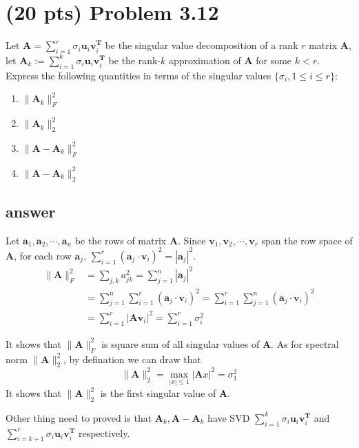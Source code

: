 \documentclass[12pt]{article}
\begin{document}
\section{(20 pts) Problem 3.12}
Let $\mathbf{A}=\sum_{i=1}^{r}{\sigma_i\mathbf{u}_i\mathbf{v}_i^\mathbf{T}}$ be the singular value decomposition of a rank $r$ matrix $\mathbf{A}$, let $\mathbf{A}_k:=\sum_{i=1}^k{\sigma_i\mathbf{u}_i\mathbf{v}_i^\mathbf{T}}$ be the rank-$k$ approximation of $\mathbf{A}$ for some $k<r$. Express the following quantities in terms of the singular values $\{\sigma_i,1\le i\le r\}$:
  \begin{enumerate}
      \item $\|\mathbf{A}_k \|_F^2$
      \item $\|\mathbf{A}_k \|_2^2$
      \item $\|\mathbf{A}-\mathbf{A}_k \|_F^2$
      \item $\|\mathbf{A}-\mathbf{A}_k \|_2^2$
  \end{enumerate}

\subsection*{answer}

Let $\mathbf a_1, \mathbf a_2, \cdots, \mathbf a_n$ be the rows of matrix $\mathbf A$. Since $\mathbf v_1, \mathbf v_2, \cdots, \mathbf v_r$ span the row space of $\mathbf A$, for each row $\mathbf a_j$, $\sum\limits_{i=1}^{r}(\mathbf a_j \cdot \mathbf v_i)^2 = |\mathbf a_j|^2$. 
\begin{align*}
\|\mathbf A\|_F^2 &= \sum_{j,k}a_{jk}^2
= \sum_{j=1}^{n}|\mathbf a_j|^2\\
&= \sum_{j=1}^{n}\sum_{i=1}^{r}(\mathbf a_j \cdot \mathbf v_i)^2
= \sum_{i=1}^{r}\sum_{j=1}^{n}(\mathbf a_j \cdot \mathbf v_i)^2\\
&= \sum_{i=1}^{r}|\mathbf A\mathbf v_i|^2
= \sum_{i=1}^{r}\sigma_i^2
\end{align*}

It shows that $\|\mathbf A\|_F^2$ is square sum of all singular values of $\mathbf A$. As for spectral norm $\|\mathbf A\|_2^2$, by defination we can draw that
$$\|\mathbf A\|_2^2 = \max_{|x| \le 1}|\mathbf Ax|^2 = \sigma_1^2$$
It shows that $\|\mathbf A\|_2^2$ is the first singular value of $\mathbf A$.

Other thing need to proved is that $\mathbf A_k, \mathbf A - \mathbf A_k$ have SVD $\sum_{i=1}^{k}{\sigma_i\mathbf{u}_i\mathbf{v}_i^\mathbf{T}}$ and $\sum_{i=k+1}^{r}{\sigma_i\mathbf{u}_i\mathbf{v}_i^\mathbf{T}}$ respectively.
\end{document}
